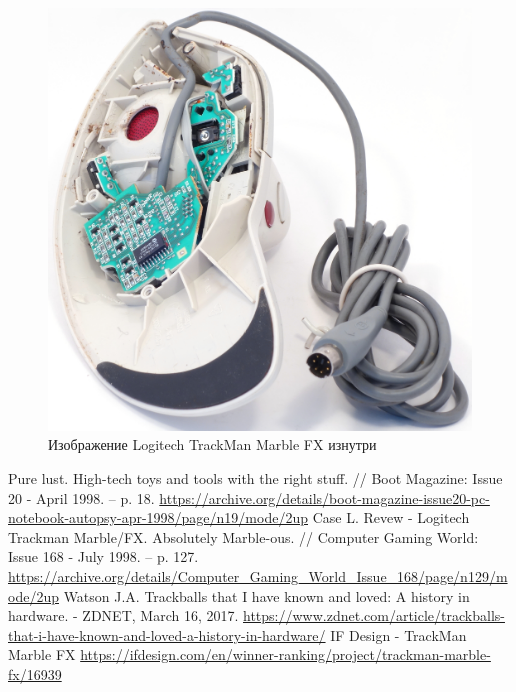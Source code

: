 \documentclass[11pt, a4paper]{article}
\begin{document}
\begin{figure}[h]
    \centering
    \includegraphics[scale=0.6]{1998_logitech_trackman_marble_fx/inside_30.jpg}
    \caption{Изображение Logitech TrackMan Marble FX изнутри}
    \label{fig:trackmanInside}
\end{figure}

\begin{thebibliography}{9}
 Pure lust. High-tech toys and tools with the right stuff. // Boot Magazine: Issue 20 - April 1998. -- p. 18. \url{https://archive.org/details/boot-magazine-issue20-pc-notebook-autopsy-apr-1998/page/n19/mode/2up}
 Case L. Revew - Logitech Trackman Marble/FX. Absolutely Marble-ous. // Computer Gaming World: Issue 168 - July 1998. -- p. 127.  \url{https://archive.org/details/Computer_Gaming_World_Issue_168/page/n129/mode/2up}
 Watson J.A. Trackballs that I have known and loved: A history in hardware. - ZDNET, March 16, 2017. \url{https://www.zdnet.com/article/trackballs-that-i-have-known-and-loved-a-history-in-hardware/}
 IF Design - TrackMan Marble FX \url{https://ifdesign.com/en/winner-ranking/project/trackman-marble-fx/16939}
\end{thebibliography}
\end{document}
